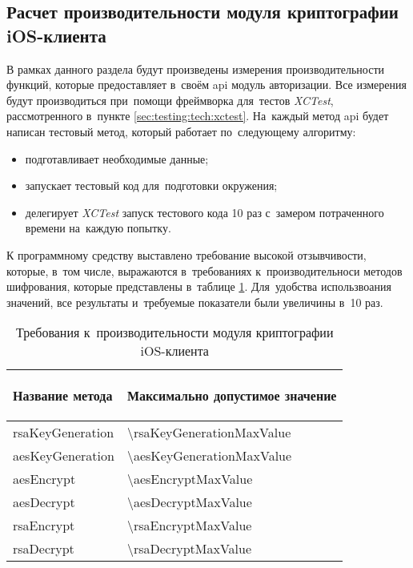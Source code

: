 \subsection{Расчет производительности модуля криптографии iOS-клиента}
\label{sec:eng:performance}

В рамках данного раздела будут произведены измерения производительности функций, которые предоставляет в~своём \gls{api} модуль авторизации. Все измерения будут производиться при~помощи фреймворка для~тестов \textit{XCTest}, рассмотренного в~пункте \ref{sec:testing:tech:xctest}. На~каждый метод \gls{api} будет написан тестовый метод, который работает по~следующему алгоритму:

\begin{itemize}
	\item подготавливает необходимые данные;
	\item запускает тестовый код для~подготовки окружения;
	\item делегирует \textit{XCTest} запуск тестового кода 10 раз с~замером потраченного времени на~каждую попытку.
\end{itemize}

К программному средству выставлено требование высокой отзывчивости, которые, в~том числе, выражаются в~требованиях к~производительноси методов шифрования, которые представлены в~таблице \ref{sec:eng:performance:aesenc:expected}. Для~удобства использвоания значений, все результаты и~требуемые показатели были увеличины в~10 раз.


\newcommand{\perfDev}{\text{П}_\text{о}}
\newcommand{\perfLimit}{\text{П}_\text{пд}}
\newcommand{\perfMax}{\text{П}_\text{макс}}
\newcommand{\perfMin}{\text{П}_\text{мин}}
\newcommand{\perfAverage}{\text{П}_\text{ср}}

\begin{table}[!ht]
  \caption{Требования к~производительности модуля криптографии iOS-клиента}
  \label{sec:eng:performance:aesenc:expected}
  \centering
  \begin{tabularx}{\linewidth}{
    |>{\hsize=1.4\hsize}X|
    >{\centering\arraybackslash\hsize=0.6\hsize}X|
  }
  \hline
 \begin{center}Название метода\end{center} & Максимально допустимое значение \\
 \hline
 rsaKeyGeneration & \num{\rsaKeyGenerationMaxValue} \\
 \hline
 aesKeyGeneration & \num{\aesKeyGenerationMaxValue} \\
 \hline
 aesEncrypt & \num{\aesEncryptMaxValue} \\
 \hline
 aesDecrypt & \num{\aesDecryptMaxValue} \\
 \hline
 rsaEncrypt & \num{\rsaEncryptMaxValue} \\
 \hline
 rsaDecrypt & \num{\rsaDecryptMaxValue} \\
 \hline
  \end{tabularx}
\end{table}

